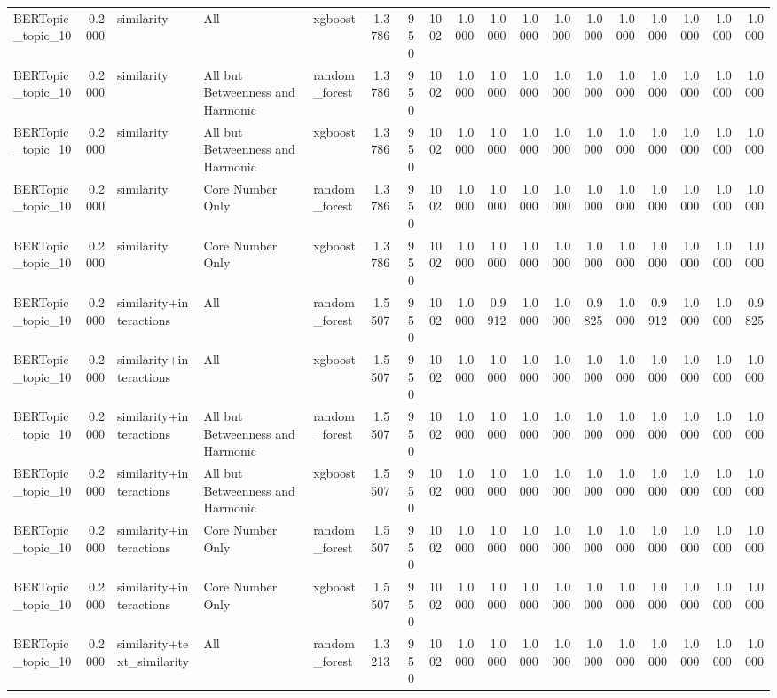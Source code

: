 \begin{tabular}{lrlllrrrrrrrrrrrrr}
BERTopic_topic_10 & 0.2000 & similarity & All & xgboost & 1.3786 & 950 & 1002 & 1.0000 & 1.0000 & 1.0000 & 1.0000 & 1.0000 & 1.0000 & 1.0000 & 1.0000 & 1.0000 & 1.0000 \\
BERTopic_topic_10 & 0.2000 & similarity & All but Betweenness and Harmonic & random_forest & 1.3786 & 950 & 1002 & 1.0000 & 1.0000 & 1.0000 & 1.0000 & 1.0000 & 1.0000 & 1.0000 & 1.0000 & 1.0000 & 1.0000 \\
BERTopic_topic_10 & 0.2000 & similarity & All but Betweenness and Harmonic & xgboost & 1.3786 & 950 & 1002 & 1.0000 & 1.0000 & 1.0000 & 1.0000 & 1.0000 & 1.0000 & 1.0000 & 1.0000 & 1.0000 & 1.0000 \\
BERTopic_topic_10 & 0.2000 & similarity & Core Number Only & random_forest & 1.3786 & 950 & 1002 & 1.0000 & 1.0000 & 1.0000 & 1.0000 & 1.0000 & 1.0000 & 1.0000 & 1.0000 & 1.0000 & 1.0000 \\
BERTopic_topic_10 & 0.2000 & similarity & Core Number Only & xgboost & 1.3786 & 950 & 1002 & 1.0000 & 1.0000 & 1.0000 & 1.0000 & 1.0000 & 1.0000 & 1.0000 & 1.0000 & 1.0000 & 1.0000 \\
BERTopic_topic_10 & 0.2000 & similarity+interactions & All & random_forest & 1.5507 & 950 & 1002 & 1.0000 & 0.9912 & 1.0000 & 1.0000 & 0.9825 & 1.0000 & 0.9912 & 1.0000 & 1.0000 & 0.9825 \\
BERTopic_topic_10 & 0.2000 & similarity+interactions & All & xgboost & 1.5507 & 950 & 1002 & 1.0000 & 1.0000 & 1.0000 & 1.0000 & 1.0000 & 1.0000 & 1.0000 & 1.0000 & 1.0000 & 1.0000 \\
BERTopic_topic_10 & 0.2000 & similarity+interactions & All but Betweenness and Harmonic & random_forest & 1.5507 & 950 & 1002 & 1.0000 & 1.0000 & 1.0000 & 1.0000 & 1.0000 & 1.0000 & 1.0000 & 1.0000 & 1.0000 & 1.0000 \\
BERTopic_topic_10 & 0.2000 & similarity+interactions & All but Betweenness and Harmonic & xgboost & 1.5507 & 950 & 1002 & 1.0000 & 1.0000 & 1.0000 & 1.0000 & 1.0000 & 1.0000 & 1.0000 & 1.0000 & 1.0000 & 1.0000 \\
BERTopic_topic_10 & 0.2000 & similarity+interactions & Core Number Only & random_forest & 1.5507 & 950 & 1002 & 1.0000 & 1.0000 & 1.0000 & 1.0000 & 1.0000 & 1.0000 & 1.0000 & 1.0000 & 1.0000 & 1.0000 \\
BERTopic_topic_10 & 0.2000 & similarity+interactions & Core Number Only & xgboost & 1.5507 & 950 & 1002 & 1.0000 & 1.0000 & 1.0000 & 1.0000 & 1.0000 & 1.0000 & 1.0000 & 1.0000 & 1.0000 & 1.0000 \\
BERTopic_topic_10 & 0.2000 & similarity+text_similarity & All & random_forest & 1.3213 & 950 & 1002 & 1.0000 & 1.0000 & 1.0000 & 1.0000 & 1.0000 & 1.0000 & 1.0000 & 1.0000 & 1.0000 & 1.0000 \\

\end{tabular}
